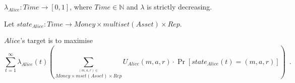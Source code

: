   \begin{definition}
    $\lambda_{Alice} : Time \rightarrow \left[0, 1\right]$, where $Time \in \mathbb{N}$
    and $\lambda$ is strictly decreasing.
  \end{definition}
  \begin{definition}[State]
  Let $state_{Alice} : Time \rightarrow Money \times multiset\left(Asset\right) \times
  Rep$.
  \end{definition}
  $Alice$'s target is to maximise
  \begin{equation*}
    \sum\limits_{t = 1}^{\infty}
    \lambda_{Alice}\left(t\right)\left(\sum\limits_{\overset{\left(m, a, r\right)
    \in}{Money \times mset\left(Asset\right) \times Rep}} U_{Alice}\left(m, a,
    r\right) \cdot \Pr\left[state_{Alice}\left(t\right) = \left(m, a,
    r\right)\right]\right) \enspace.
  \end{equation*}
